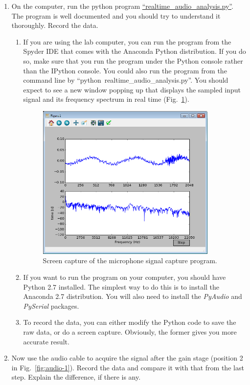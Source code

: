 \documentclass[letterpaper, 11pt]{article}
\begin{document}
\begin{enumerate}
	\item On the computer, run the python program \href{https://github.com/ucdart/UCD-EEC134/blob/master/labs/lab1/code/realtime_audio_analysis.py}{``realtime\_audio\_analysis.py''}. The program is well documented and you should try to understand it thoroughly. Record the data. 
		\begin{enumerate}
			\item If you are using the lab computer, you can run the program from the Spyder IDE that comes with the Anaconda Python distribution. If you do so, make sure that you run the program under the Python console rather than the IPython console. You could also run the program from the command line by ``python~realtime\_audio\_analysis.py''. You should expect to see a new window popping up that displays the sampled input signal and its frequency spectrum in real time (Fig.~\ref{fig:audio-capture-sound-card}). 
				\begin{figure}[h]
					\centering
					\includegraphics[width=3.5in]{audio-capture-sound-card.png}
					\caption{Screen capture of the microphone signal capture program.}
					\label{fig:audio-capture-sound-card}
				\end{figure}
				
			\item If you want to run the program on your computer, you should have Python 2.7 installed. The simplest way to do this is to install the Anaconda 2.7 distribution. You will also need to install the \textit{PyAudio} and \textit{PySerial} packages. 
			
			\item To record the data, you can either modify the Python code to save the raw data, or do a screen capture. Obviously, the former gives you more accurate result. 
		\end{enumerate}
	
	\item Now use the audio cable to acquire the signal after the gain stage (position 2 in Fig.~\ref{fig:audio-1}). Record the data and compare it with that from the last step. Explain the difference, if there is any. 
\end{enumerate}
\end{document}
